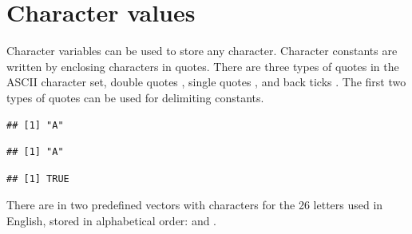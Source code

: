 \documentclass[krantz2]{krantz}\usepackage{knitr}%
\begin{document}
\section{Character values}\label{sec:calc:character}
Character variables can be used to store any character. Character constants are written by enclosing characters in quotes. There are three types of quotes in the ASCII character set, double quotes , single quotes , and back ticks . The first two types of quotes can be used for delimiting  constants.
\begin{knitrout}\footnotesize
{}\color{fgcolor}\begin{kframe}
\begin{alltt}
 \hlkwb{<-} 
\end{alltt}
\begin{verbatim}
## [1] "A"
\end{verbatim}
\begin{alltt}
 \hlkwb{<-} 
\end{alltt}
\begin{verbatim}
## [1] "A"
\end{verbatim}
\begin{alltt}
 \hlopt{==} 
\end{alltt}
\begin{verbatim}
## [1] TRUE
\end{verbatim}
\end{kframe}
\end{knitrout}

There are in \Rlang two predefined vectors with characters for the 26 letters used in English, stored in alphabetical order:  and .
\end{document}
